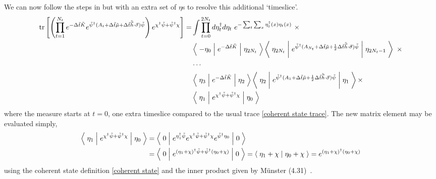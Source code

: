 We can now follow the steps in  but with an extra set of $\eta$s to resolve this additional `timeslice'.
\begin{align}
	\text{tr}\left[\left(\prod_{t=1}^{N_t} e^{-\Delta \tilde{t}\tilde{K}}  e^{ \tilde{\psi}{}^{\dagger} (A_t + \Delta\tilde{t} \tilde{\mu} + \Delta\tilde{t}\tilde{\vec{h}}\cdot\vec{\sigma}) \tilde{\psi} }\right) e^{\chi{}^{\dagger} \tilde{\psi} + \tilde{\psi}{}^{\dagger} \chi}\right]
	=& \int \prod_{t=0}^{2N_t} d \eta^{\dagger}_t d\eta_t ~ e^{- \sum_{t}\sum_x \eta^{\dagger}_t(x) \eta_t(x)}~ \times
	\nonumber\\
	&
		\left\langle\; -\eta_0 \;\middle|\; e^{-\Delta \tilde{t}\tilde{K} }\;\middle|\;\eta_{2 N_t}\;\right\rangle
		\left\langle\; \eta_{2 N_t} \;\middle|\; e^{ \tilde{\psi}{}^{\dagger} (A_{N_t} + \Delta\tilde{t}\tilde{\mu} + \frac{1}{2} \Delta\tilde{t}\tilde{\vec{h}}\cdot\vec{\sigma})\tilde{\psi} } \;\middle|\;\eta_{2 N_t-1}\;\right\rangle ~ \times
	\nonumber\\
	&
		\cdots
	\nonumber\\
	&
		\left\langle\; \eta_3 \;\middle|\; e^{-\Delta \tilde{t}\tilde{K} }\;\middle|\;\eta_{2}\;\right\rangle
		\left\langle\; \eta_2 \;\middle|\; e^{ \tilde{\psi}{}^{\dagger} (A_{1} + \Delta\tilde{t}\tilde{\mu} + \frac{1}{2} \Delta\tilde{t}\tilde{\vec{h}}\cdot\vec{\sigma}) \tilde{\psi}} \;\middle|\;\eta_1\;\right\rangle \times
	\nonumber\\
	&
		\left\langle\; \eta_1 \;\middle|\; e^{\chi{}^{\dagger} \tilde{\psi} + \tilde{\psi}{}^{\dagger} \chi} \;\middle|\; \eta_0 \;\right\rangle
\end{align}
where the measure starts at $t=0$, one extra timeslice compared to the usual trace \eqref{coherent state trace}.
The new matrix element may be evaluated simply,
\begin{align}
	\left\langle\; \eta_1 \;\middle|\; e^{\chi{}^{\dagger} \tilde{\psi} + \tilde{\psi}{}^{\dagger} \chi} \;\middle|\; \eta_0 \;\right\rangle
	&=
	\left\langle\; 0 \;\middle|\; e^{\eta{}^{\dagger}_1 \tilde{\psi}} e^{\chi{}^{\dagger} \tilde{\psi} + \tilde{\psi}{}^{\dagger} \chi} e^{\tilde{\psi}{}^{\dagger} \eta_0}\;\middle|\; 0 \;\right\rangle
	\nonumber\\
	&=
	\left\langle\; 0 \;\middle|\; e^{(\eta_1+\chi){}^{\dagger} \tilde{\psi} + \tilde{\psi}{}^{\dagger} (\eta_0 + \chi)} \;\middle|\; 0 \;\right\rangle
	=
	\left\langle\;\eta_1 + \chi\;\middle|\;\eta_0 + \chi\;\right\rangle
	=
	e^{(\eta_1+\chi){}^{\dagger} (\eta_0+\chi)}
\end{align}
using the coherent state definition \eqref{coherent state} and the inner product given by M\"{u}nster (4.31)~\cite{munster}.

